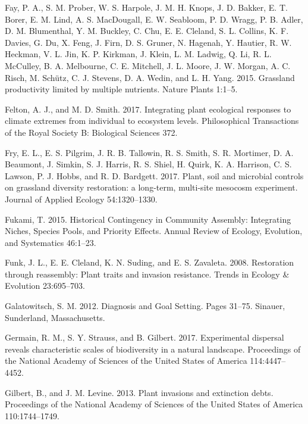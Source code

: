 \documentclass[twoside,12pt,final]{ucthesis-CA2012}
\newlength{\cslhangindent}
\newenvironment{cslreferences}%
  {\setlength{\parindent}{0pt}%
  \everypar{\setlength{\hangindent}{\cslhangindent}}\ignorespaces}%
  {\par}
\begin{document}
\begin{ucmainmatter}
\begin{cslreferences}
\leavevmode\hypertarget{ref-Fay2015}{}%
Fay, P. A., S. M. Prober, W. S. Harpole, J. M. H. Knops, J. D. Bakker, E. T. Borer, E. M. Lind, A. S. MacDougall, E. W. Seabloom, P. D. Wragg, P. B. Adler, D. M. Blumenthal, Y. M. Buckley, C. Chu, E. E. Cleland, S. L. Collins, K. F. Davies, G. Du, X. Feng, J. Firn, D. S. Gruner, N. Hagenah, Y. Hautier, R. W. Heckman, V. L. Jin, K. P. Kirkman, J. Klein, L. M. Ladwig, Q. Li, R. L. McCulley, B. A. Melbourne, C. E. Mitchell, J. L. Moore, J. W. Morgan, A. C. Risch, M. Schütz, C. J. Stevens, D. A. Wedin, and L. H. Yang. 2015. Grassland productivity limited by multiple nutrients. Nature Plants 1:1--5.

\leavevmode\hypertarget{ref-Felton2017}{}%
Felton, A. J., and M. D. Smith. 2017. Integrating plant ecological responses to climate extremes from individual to ecosystem levels. Philosophical Transactions of the Royal Society B: Biological Sciences 372.

\leavevmode\hypertarget{ref-Fry2017}{}%
Fry, E. L., E. S. Pilgrim, J. R. B. Tallowin, R. S. Smith, S. R. Mortimer, D. A. Beaumont, J. Simkin, S. J. Harris, R. S. Shiel, H. Quirk, K. A. Harrison, C. S. Lawson, P. J. Hobbs, and R. D. Bardgett. 2017. Plant, soil and microbial controls on grassland diversity restoration: a long-term, multi-site mesocosm experiment. Journal of Applied Ecology 54:1320--1330.

\leavevmode\hypertarget{ref-Fukami2015}{}%
Fukami, T. 2015. Historical Contingency in Community Assembly: Integrating Niches, Species Pools, and Priority Effects. Annual Review of Ecology, Evolution, and Systematics 46:1--23.

\leavevmode\hypertarget{ref-Funk2008}{}%
Funk, J. L., E. E. Cleland, K. N. Suding, and E. S. Zavaleta. 2008. Restoration through reassembly: Plant traits and invasion resistance. Trends in Ecology \& Evolution 23:695--703.

\leavevmode\hypertarget{ref-Galatowitsch2012}{}%
Galatowitsch, S. M. 2012. Diagnosis and Goal Setting. Pages 31--75. Sinauer, Sunderland, Massachusetts.

\leavevmode\hypertarget{ref-germain2017}{}%
Germain, R. M., S. Y. Strauss, and B. Gilbert. 2017. Experimental dispersal reveals characteristic scales of biodiversity in a natural landscape. Proceedings of the National Academy of Sciences of the United States of America 114:4447--4452.

\leavevmode\hypertarget{ref-gilbert2013}{}%
Gilbert, B., and J. M. Levine. 2013. Plant invasions and extinction debts. Proceedings of the National Academy of Sciences of the United States of America 110:1744--1749.


\end{cslreferences}
\end{ucmainmatter}
\end{document}
